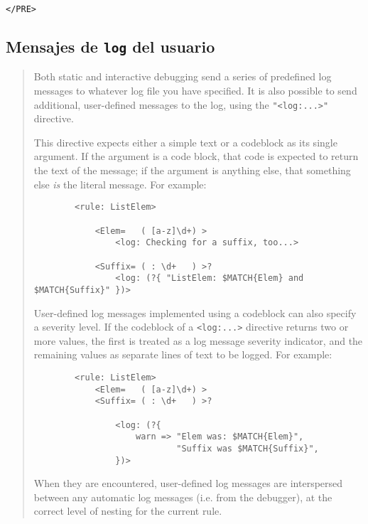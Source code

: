 \begin{verbatim}
</PRE>

\end{verbatim}

\subsection{Mensajes de {\tt log} del usuario}

\begin{it}\begin{quotation}
    Both static and interactive debugging send a series of predefined log
    messages to whatever log file you have specified. It is also possible to
    send additional, user-defined messages to the log, using the \verb|"<log:...>"|
    directive.

    This directive expects either a simple text or a codeblock as its single
    argument. If the argument is a code block, that code is expected to
    return the text of the message; if the argument is anything else, that
    something else \emph{is} the literal message. For example:

\begin{verbatim}
        <rule: ListElem>

            <Elem=   ( [a-z]\d+) >
                <log: Checking for a suffix, too...>

            <Suffix= ( : \d+   ) >?
                <log: (?{ "ListElem: $MATCH{Elem} and $MATCH{Suffix}" })>
\end{verbatim}

    User-defined log messages implemented using a codeblock can also specify
    a severity level. If the codeblock of a \verb"<log:...>" directive returns
    two or more values, the first is treated as a log message severity
    indicator, and the remaining values as separate lines of text to be
    logged. For example:

\begin{verbatim}
        <rule: ListElem>
            <Elem=   ( [a-z]\d+) >
            <Suffix= ( : \d+   ) >?

                <log: (?{
                    warn => "Elem was: $MATCH{Elem}",
                            "Suffix was $MATCH{Suffix}",
                })>
\end{verbatim}

    When they are encountered, user-defined log messages are interspersed
    between any automatic log messages (i.e. from the debugger), at the
    correct level of nesting for the current rule.
\end{quotation}\end{it}


